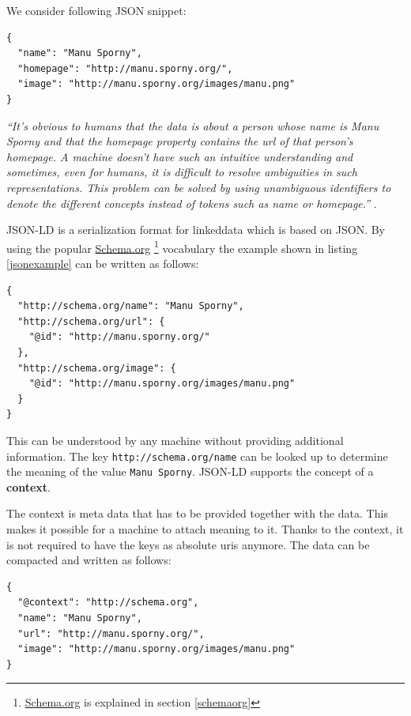 We consider following JSON snippet:

\lstset{language=JSON}
\begin{lstlisting}[caption=Data of a person in the JSON format., label=jsonexample]
{
  "name": "Manu Sporny",
  "homepage": "http://manu.sporny.org/",
  "image": "http://manu.sporny.org/images/manu.png"
}
\end{lstlisting}

\textit{``It's obvious to humans that the data is about a person whose name is \textit{Manu Sporny} and that the homepage property contains the \gls{url} of that person's homepage. A machine doesn't have such an intuitive understanding and sometimes, even for humans, it is difficult to resolve ambiguities in such representations. This problem can be solved by using unambiguous identifiers to denote the different concepts instead of tokens such as name or homepage.''} \citep{jsonldbasicconcepts}.

JSON-LD is a serialization format for \gls{linkeddata} which is based on JSON. By using the popular \url{Schema.org} \footnote{\url{Schema.org} is explained in section \ref{schemaorg}} vocabulary the example shown in listing \ref{jsonexample} can be written as follows:

\lstset{language=JSON}
\begin{lstlisting}[caption=Data of a person in the JSON-LD format., label=jsonldexample]
{
  "http://schema.org/name": "Manu Sporny",
  "http://schema.org/url": {
    "@id": "http://manu.sporny.org/"
  },
  "http://schema.org/image": {
    "@id": "http://manu.sporny.org/images/manu.png"
  }
}
\end{lstlisting}

This can be understood by any machine without providing additional information. The key \lstinline{http://schema.org/name} can be looked up to determine the meaning of the value \lstinline{Manu Sporny}. JSON-LD supports the concept of a \textbf{context}.

The context is meta data that has to be provided together with the data. This makes it possible for a machine to attach meaning to it. Thanks to the context, it is not required to have the keys as absolute \gls{uri}s anymore. The data can be compacted and written as follows:

\lstset{language=JSON}
\begin{lstlisting}[caption=Compacted JSON-LD data of a person., label=jsonldcompacted]
{
  "@context": "http://schema.org",
  "name": "Manu Sporny",
  "url": "http://manu.sporny.org/",
  "image": "http://manu.sporny.org/images/manu.png"
}
\end{lstlisting}

